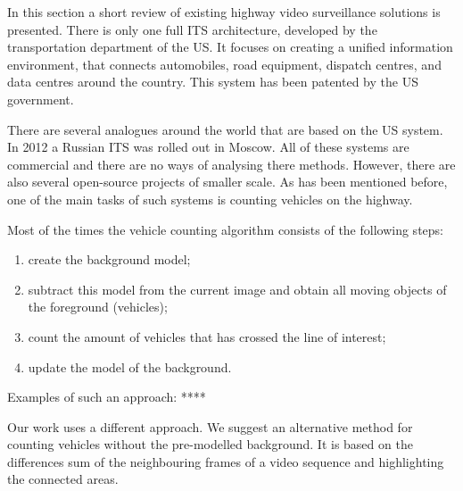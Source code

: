 \documentclass[12pt,a4paper,oneside,titlepage]{article}
\begin{document}
In this section a short review of existing highway video surveillance solutions is presented.
There is only one full ITS architecture, developed by the transportation department of the US. It focuses on creating a unified information environment, that connects automobiles, road equipment, dispatch centres,  and data centres around the country. This system has been patented by the US government.

There are several analogues around the world that are based on the US system. In 2012 a Russian ITS was rolled out in Moscow. All of these systems are commercial and there are no ways of analysing there methods.
However, there are also several open-source projects of smaller scale.
As has been mentioned before, one of the main tasks of such systems is counting vehicles on the highway.

Most of the times the vehicle counting algorithm consists of the following steps:


\begin{enumerate}
  \item create the background model;
  \item subtract this model from the current image and obtain all moving objects of the foreground (vehicles);
  \item count the amount of vehicles that has crossed the line of interest;
  \item update the model of the background.
\end{enumerate}



Examples of such an approach: ****\

Our work uses a different approach. We suggest an alternative method for counting vehicles without the pre-modelled background.
It is based on the differences sum  of the neighbouring frames of a video sequence and highlighting the connected areas.



























\newpage
\end{document}
